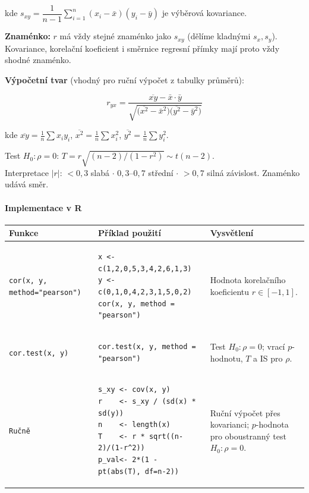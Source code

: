 \documentclass[a4paper, 11pt]{article}
\newenvironment{funkcedict}
{%
  \begingroup
  \renewcommand{\arraystretch}{1.4}%
  \lstset{basicstyle=\ttfamily\small, columns=fullflexible}%
  \setlength{\tabcolsep}{4pt}%
  \begin{tabular}{p{0.19\textwidth} p{0.38\textwidth} p{0.30\textwidth}}
  \textbf{Funkce} & \textbf{Příklad použití} & \textbf{Vysvětlení} \\
  \midrule
}
{%
  \end{tabular}%
  \endgroup
}
\begin{document}
kde $s_{xy} = \dfrac{1}{n-1}\sum_{i=1}^n(x_i-\bar{x})(y_i-\bar{y})$ je výběrová kovariance.

\medskip
\noindent\textbf{Znaménko:} $r$ má vždy stejné znaménko jako $s_{xy}$ (dělíme kladnými $s_x, s_y$).
Kovariance, korelační koeficient i směrnice regresní přímky mají proto vždy shodné znaménko.

\medskip
\noindent\textbf{Výpočetní tvar} (vhodný pro ruční výpočet z tabulky průměrů):

\begin{equation*}
	r_{yx} = \frac{\overline{xy} - \bar{x}\cdot\bar{y}}{\sqrt{\bigl(\overline{x^2} - \bar{x}^2\bigr)\bigl(\overline{y^2} - \bar{y}^2\bigr)}}
\end{equation*}

kde $\overline{xy} = \tfrac{1}{n}\sum x_i y_i$,\; $\overline{x^2} = \tfrac{1}{n}\sum x_i^2$,\; $\overline{y^2} = \tfrac{1}{n}\sum y_i^2$.

\medskip
Test $H_0\colon \rho = 0$: $T = r\sqrt{(n-2)/(1-r^2)} \sim t(n-2)$. \\
Interpretace $|r|$: $< 0{,}3$ slabá $\cdot$ $0{,}3$--$0{,}7$ střední $\cdot$ $> 0{,}7$ silná závislost. Znaménko udává směr.

\paragraph{Implementace v R}\mbox{}\par

\begin{funkcedict}

	\texttt{cor(x, y, method="pearson")} &
	\begin{lstlisting}
x <- c(1,2,0,5,3,4,2,6,1,3)
y <- c(0,1,0,4,2,3,1,5,0,2)
cor(x, y, method = "pearson")
	\end{lstlisting}
	&
	Hodnota korelačního koeficientu $r \in [-1,1]$. \\

	\texttt{cor.test(x, y)} &
	\begin{lstlisting}
cor.test(x, y, method = "pearson")
	\end{lstlisting}
	&
	Test $H_0\colon \rho=0$; vrací $p$-hodnotu, $T$ a IS pro $\rho$. \\

	\texttt{Ručně} &
	\begin{lstlisting}
s_xy <- cov(x, y)
r    <- s_xy / (sd(x) * sd(y))
n    <- length(x)
T    <- r * sqrt((n-2)/(1-r^2))
p_val<- 2*(1 - pt(abs(T), df=n-2))
	\end{lstlisting}
	&
	Ruční výpočet přes kovarianci; $p$-hodnota pro oboustranný test $H_0\colon\rho=0$. \\

\end{funkcedict}
\end{document}
